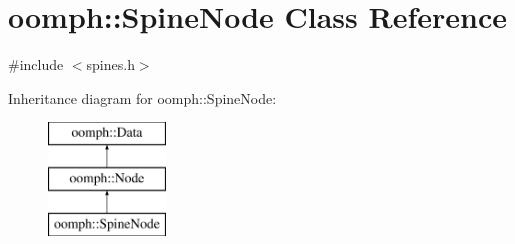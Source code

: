 \hypertarget{classoomph_1_1SpineNode}{}\section{oomph\+:\+:Spine\+Node Class Reference}
\label{classoomph_1_1SpineNode}


{\ttfamily \#include $<$spines.\+h$>$}

Inheritance diagram for oomph\+:\+:Spine\+Node\+:\begin{figure}[H]
\begin{center}
\leavevmode
\includegraphics[height=3.000000cm]{classoomph_1_1SpineNode}
\end{center}
\end{figure}
